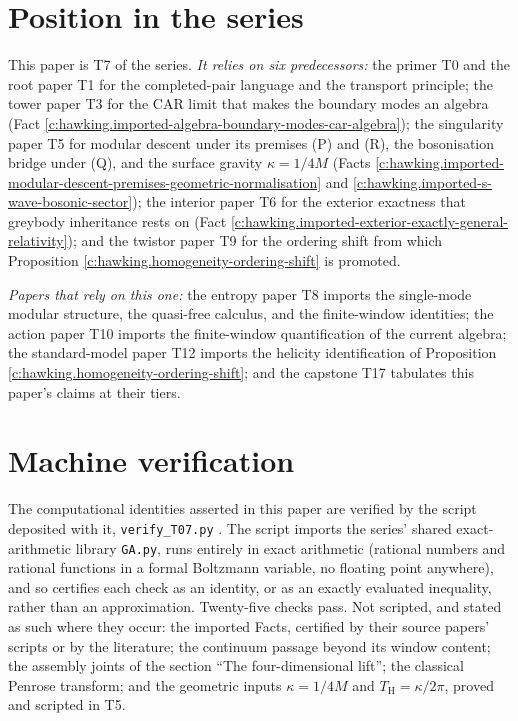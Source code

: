 \documentclass[11pt]{article}
\theoremstyle{definition}
\theoremstyle{plain}
\providecommand{\TH}{}\renewcommand{\TH}{T_{\mathrm{H}}}
\begin{document}
\section{Position in the series}

\label{c:note.hawking.setting-position-series}
This paper is T7 of the series. \emph{It relies on six predecessors:} the primer T0 \cite{ButlerT0} and the root paper T1 \cite{ButlerT1} for the completed-pair language and the transport principle; the tower paper T3 \cite{ButlerT3} for the CAR limit that makes the boundary modes an algebra (Fact \ref{c:hawking.imported-algebra-boundary-modes-car-algebra}); the singularity paper T5 \cite{ButlerT5} for modular descent under its premises (P) and (R), the bosonisation bridge under (Q), and the surface gravity $\kappa = 1/4M$ (Facts \ref{c:hawking.imported-modular-descent-premises-geometric-normalisation} and \ref{c:hawking.imported-s-wave-bosonic-sector}); the interior paper T6 \cite{ButlerT6} for the exterior exactness that greybody inheritance rests on (Fact \ref{c:hawking.imported-exterior-exactly-general-relativity}); and the twistor paper T9 \cite{ButlerT9} for the ordering shift from which Proposition \ref{c:hawking.homogeneity-ordering-shift} is promoted.

\emph{Papers that rely on this one:} the entropy paper T8 \cite{ButlerT8} imports the single-mode modular structure, the quasi-free calculus, and the finite-window identities; the action paper T10 \cite{ButlerT10} imports the finite-window quantification of the current algebra; the standard-model paper T12 \cite{ButlerT12} imports the helicity identification of Proposition \ref{c:hawking.homogeneity-ordering-shift}; and the capstone T17 \cite{ButlerT17} tabulates this paper's claims at their tiers.

\section{Machine verification}

\label{c:note.hawking.setting-machine-verification}
The computational identities asserted in this paper are verified by the script deposited with it, \texttt{verify\_T07.py} \cite{ButlerVerifyT7}. The script imports the series' shared exact-arithmetic library \texttt{GA.py}, runs entirely in exact arithmetic (rational numbers and rational functions in a formal Boltzmann variable, no floating point anywhere), and so certifies each check as an identity, or as an exactly evaluated inequality, rather than an approximation. Twenty-five checks pass. Not scripted, and stated as such where they occur: the imported Facts, certified by their source papers' scripts or by the literature; the continuum passage beyond its window content; the assembly joints of the section ``The four-dimensional lift''; the classical Penrose transform; and the geometric inputs $\kappa = 1/4M$ and $\TH = \kappa/2\pi$, proved and scripted in T5.
\end{document}
